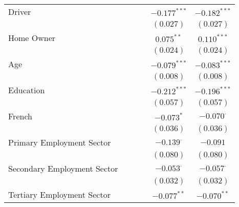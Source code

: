 \begin{center}
\begin{tiny}
\begin{longtable}{l@{} c@{} c@{} c@{} c@{} c@{}}
\quad Driver                            &                &                  &                & $-0.177^{***}$   & $-0.182^{***}$   \\
                                        &                &                  &                & $(0.027)$        & $(0.027)$        \\
\quad Home Owner                        &                &                  &                & $0.075^{**}$     & $0.110^{***}$    \\
                                        &                &                  &                & $(0.024)$        & $(0.024)$        \\
\quad Age                               &                &                  &                & $-0.079^{***}$   & $-0.083^{***}$   \\
                                        &                &                  &                & $(0.008)$        & $(0.008)$        \\
\quad Education                         &                &                  &                & $-0.212^{***}$   & $-0.196^{***}$   \\
                                        &                &                  &                & $(0.057)$        & $(0.057)$        \\
\quad French                            &                &                  &                & $-0.073^{*}$     & $-0.070^{\cdot}$ \\
                                        &                &                  &                & $(0.036)$        & $(0.036)$        \\
\quad Primary Employment Sector         &                &                  &                & $-0.139^{\cdot}$ & $-0.091$         \\
                                        &                &                  &                & $(0.080)$        & $(0.080)$        \\
\quad Secondary Employment Sector       &                &                  &                & $-0.053^{\cdot}$ & $-0.057^{\cdot}$ \\
                                        &                &                  &                & $(0.032)$        & $(0.032)$        \\
\quad Tertiary Employment Sector        &                &                  &                & $-0.077^{**}$    & $-0.070^{**}$    \\

\end{longtable}
\end{tiny}
\end{center}
